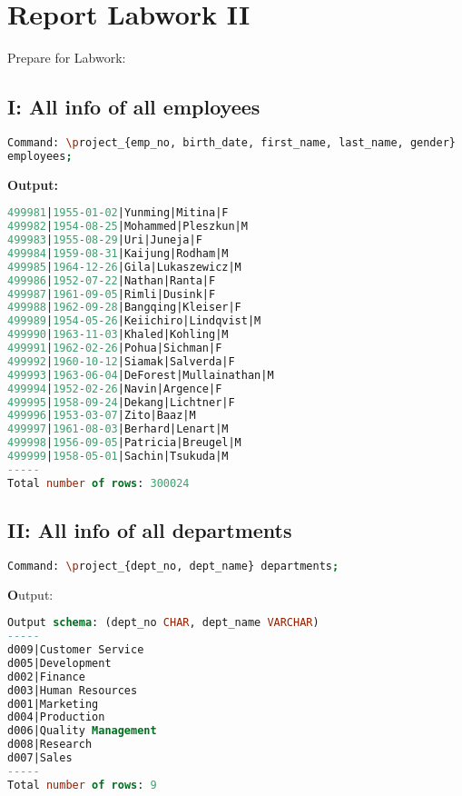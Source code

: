 \documentclass[12pt]{report}
\begin{document}
\section*{Report Labwork II}

Prepare for Labwork:

{\small
{}}
{\small
{}}
{\small
{}}
{\small
{}}
{\small
{}}


\subsection*{I: All info of all employees}

\begin{lstlisting}[language=bash]
Command: \project_{emp_no, birth_date, first_name, last_name, gender}
employees;
\end{lstlisting}
\textbf{Output:}

\begin{lstlisting}[language=sql]
499981|1955-01-02|Yunming|Mitina|F
499982|1954-08-25|Mohammed|Pleszkun|M
499983|1955-08-29|Uri|Juneja|F
499984|1959-08-31|Kaijung|Rodham|M
499985|1964-12-26|Gila|Lukaszewicz|M
499986|1952-07-22|Nathan|Ranta|F
499987|1961-09-05|Rimli|Dusink|F
499988|1962-09-28|Bangqing|Kleiser|F
499989|1954-05-26|Keiichiro|Lindqvist|M
499990|1963-11-03|Khaled|Kohling|M
499991|1962-02-26|Pohua|Sichman|F
499992|1960-10-12|Siamak|Salverda|F
499993|1963-06-04|DeForest|Mullainathan|M
499994|1952-02-26|Navin|Argence|F
499995|1958-09-24|Dekang|Lichtner|F
499996|1953-03-07|Zito|Baaz|M
499997|1961-08-03|Berhard|Lenart|M
499998|1956-09-05|Patricia|Breugel|M
499999|1958-05-01|Sachin|Tsukuda|M
-----
Total number of rows: 300024	
\end{lstlisting}


\subsection*{II: All info of all departments}
\begin{lstlisting}[language=bash]
Command: \project_{dept_no, dept_name} departments;
\end{lstlisting}
\textbf Output:
\begin{lstlisting}[language=sql]
Output schema: (dept_no CHAR, dept_name VARCHAR)
-----
d009|Customer Service
d005|Development
d002|Finance
d003|Human Resources
d001|Marketing
d004|Production
d006|Quality Management
d008|Research
d007|Sales
-----
Total number of rows: 9
\end{lstlisting}
\end{document}
